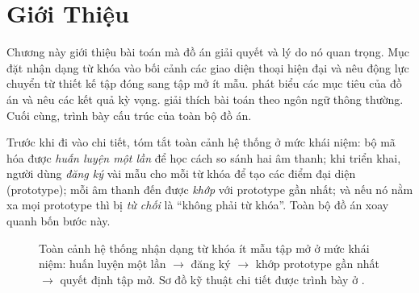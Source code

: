 \documentclass[12pt,a4paper]{report}
\begin{document}
\chapter{Giới Thiệu}\label{ch:intro}

Chương này giới thiệu bài toán mà đồ án giải quyết và lý do nó quan trọng. Mục
 đặt nhận dạng từ khóa vào bối cảnh các giao diện thoại hiện đại
và nêu động lực chuyển từ thiết kế tập đóng sang tập mở ít mẫu. 
phát biểu các mục tiêu của đồ án và  nêu các kết quả kỳ vọng.
 giải thích bài toán theo ngôn ngữ thông thường. Cuối cùng,
 trình bày cấu trúc của toàn bộ đồ án.

Trước khi đi vào chi tiết,  tóm tắt toàn cảnh hệ thống ở mức
khái niệm: bộ mã hóa được \emph{huấn luyện một lần} để học cách so sánh hai âm thanh; khi triển khai, người dùng \emph{đăng ký} vài mẫu
cho mỗi từ khóa để tạo các điểm đại diện (prototype); mỗi âm thanh đến được
\emph{khớp} với prototype gần nhất; và nếu nó nằm xa mọi prototype thì bị
\emph{từ chối} là ``không phải từ khóa''. Toàn bộ đồ án xoay quanh bốn bước này.

\begin{figure}[H]
\centering
{}
\caption{Toàn cảnh hệ thống nhận dạng từ khóa ít mẫu tập mở ở mức khái niệm: huấn
luyện một lần $\to$ đăng ký $\to$ khớp prototype gần nhất $\to$ quyết định tập mở.
Sơ đồ kỹ thuật chi tiết được trình bày ở .}
\label{fig:overview}
\end{figure}
\end{document}
